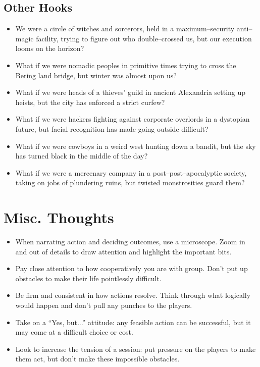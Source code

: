 \documentclass[landscape]{book}
\begin{document}
\begin{multicols*}{4}
\subsection*{Other Hooks}

\begin{itemize}
\item We were a circle of witches and sorcerors, held in a maximum--security anti--magic facility, trying to figure out who double--crossed us, but our execution looms on the horizon?
\item What if we were nomadic peoples in primitive times trying to cross the Bering land bridge, but winter was almost upon us?
\item What if we were heads of a thieves' guild in ancient Alexandria setting up heists, but the city has enforced a strict curfew?
\item What if we were hackers fighting against corporate overlords in a dystopian future, but facial recognition has made going outside difficult?
\item What if we were cowboys in a weird west hunting down a bandit, but the sky has turned black in the middle of the day?
\item What if we were a mercenary company in a post--post--apocalyptic society, taking on jobs of plundering ruins, but twisted monstrosities guard them?
\end{itemize}

\appendix

\section*{Misc. Thoughts}

\begin{itemize}
\item When narrating action and deciding outcomes, use a microscope. Zoom in and out of details to draw attention and highlight the important bits.
\item Pay close attention to how cooperatively you are with group. Don't put up obstacles to make their life pointlessly difficult.
\item Be firm and consistent in how actions resolve. Think through what logically would happen and don't pull any punches to the players.
\item Take on a ``Yes, but...'' attitude: any feasible action can be successful, but it may come at a difficult choice or cost.
\item Look to increase the tension of a session: put pressure on the players to make them act, but don't make these impossible obstacles.
\end{itemize}


\end{multicols*}
\end{document}
